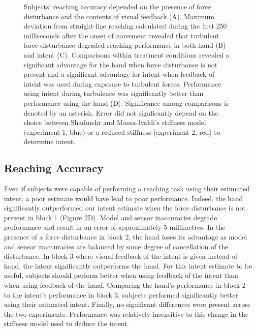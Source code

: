 \documentclass[letterpaper, 10 pt, conference]{ieeeconf}  %
\begin{document}
\begin{figure}[t]
\centering
{}
\caption{Subjects' reaching accuracy depended on the presence of force disturbance and the contents of visual feedback (A). Maximum deviation from straight-line reaching calculated during the first 250 milliseconds after the onset of movement revealed that turbulent force disturbance degraded reaching performance in both hand (B) and intent (C). Comparisons within treatment conditions revealed a significant advantage for the hand when force disturbance is not present and a significant advantage for intent when feedback of intent was used during exposure to turbulent forces. Performance using intent during turbulence was significantly better than performance using the hand (D). Significance among comparisons is denoted by an asterisk. Error did not signficantly depend on the choice between Shadmehr and Mussa-Ivaldi's\cite{shadmehr1994adaptive} stiffness model (experiment 1, blue) or a reduced stiffness (experiment 2, red) to determine intent.}
\label{error}
\end{figure}

\subsection*{Reaching Accuracy}
Even if subjects were capable of performing a reaching task using their estimated intent, a poor estimate would have lead to poor performance. Indeed, the hand significantly outperformed our intent estimate when the force disturbance is not present in block 1 (Figure 2D). Model and sensor inaccuracies degrade performance and result in an error of approximately 5 millimetres. In the presence of a force disturbance in block 2, the hand loses its advantage as model and sensor inaccuracies are balanced by some degree of cancellation of the disturbance. In block 3 where visual feedback of the intent is given instead of hand, the intent significantly outperforms the hand. For this intent estimate to be useful, subjects should perform better when using feedback of the intent than when using feedback of the hand. Comparing the hand's performance in block 2 to the intent's performance in block 3, subjects performed significantly better using their estimated intent. Finally, no significant differences were present across the two experiments. Performance was relatively insensitive to this change in the stiffness model used to deduce the intent.
\end{document}
